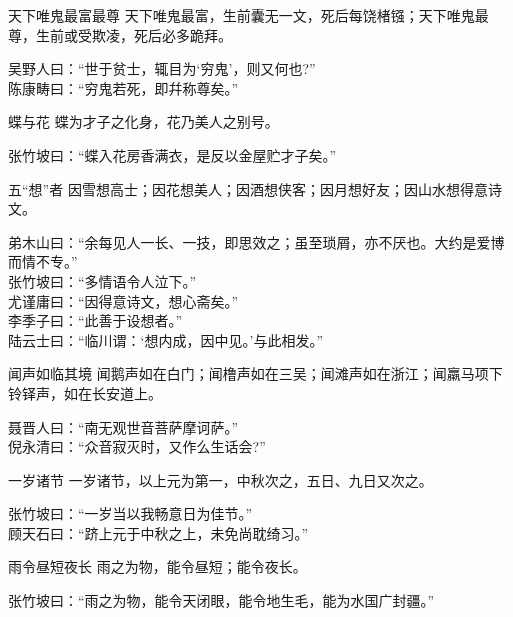\begin{yulu}{天下唯鬼最富最尊}
天下唯鬼最富，生前囊无一文，死后每饶楮镪；天下唯鬼最尊，生前或受欺凌，死后必多跪拜。
\begin{comments}
吴野人曰：“世于贫士，辄目为‘穷鬼’，则又何也?” \\
陈康畴曰：“穷鬼若死，即幷称尊矣。”
\end{comments}
\end{yulu}

\begin{yulu}{蝶与花}
蝶为才子之化身，花乃美人之别号。
\begin{comments}
张竹坡曰：“蝶入花房香满衣，是反以金屋贮才子矣。”
\end{comments}
\end{yulu}

\begin{yulu}{五“想”者}
因雪想高士；因花想美人；因酒想侠客；因月想好友；因山水想得意诗文。
\begin{comments}
弟木山曰：“余每见人一长、一技，即思效之；虽至琐屑，亦不厌也。大约是爱博而情不专。” \\
张竹坡曰：“多情语令人泣下。” \\
尤谨庸曰：“因得意诗文，想心斋矣。” \\
李季子曰：“此善于设想者。” \\
陆云士曰：“临川谓：‘想内成，因中见。’与此相发。”
\end{comments}
\end{yulu}

\begin{yulu}{闻声如临其境}
闻鹅声如在白门；闻橹声如在三吴；闻滩声如在浙江；闻羸马项下铃铎声，如在长安道上。
\begin{comments}
聂晋人曰：“南无观世音菩萨摩诃萨。” \\
倪永清曰：“众音寂灭时，又作么生话会?”
\end{comments}
\end{yulu}

\begin{yulu}{一岁诸节}
一岁诸节，以上元为第一，中秋次之，五日、九日又次之。
\begin{comments}
张竹坡曰：“一岁当以我畅意日为佳节。” \\
顾天石曰：“跻上元于中秋之上，未免尚耽绮习。”
\end{comments}
\end{yulu}

\begin{yulu}{雨令昼短夜长}
雨之为物，能令昼短；能令夜长。
\begin{comments}
张竹坡曰：“雨之为物，能令天闭眼，能令地生毛，能为水国广封疆。”
\end{comments}
\end{yulu}

